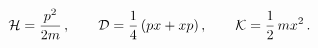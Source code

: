 \begin{equation}\label{boro3.4}
{\cal H}=\frac{p^2}{2m}\,,\qquad{\cal D}=\frac{1}{4}\,(px + xp)\,,
\qquad{\cal K}=\frac{1}{2}\,mx^2\,.
\end{equation}

